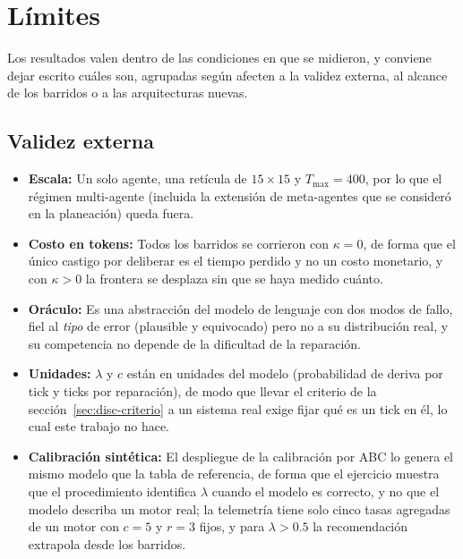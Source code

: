 \section{Límites}\label{sec:limites}

Los resultados valen dentro de las condiciones en que se midieron, y conviene dejar escrito cuáles son, agrupadas según afecten a la validez externa, al alcance de los barridos o a las arquitecturas nuevas.

\subsection*{Validez externa}

\begin{itemize}[leftmargin=1.4em, itemsep=0.3em]
  \item \textbf{Escala:} Un solo agente, una retícula de $15\times15$ y $T_{\mathrm{max}}=400$, por lo que el régimen multi-agente (incluida la extensión de meta-agentes que se consideró en la planeación) queda fuera.
  \item \textbf{Costo en tokens:} Todos los barridos se corrieron con $\kappa=0$, de forma que el único castigo por deliberar es el tiempo perdido y no un costo monetario, y con $\kappa>0$ la frontera se desplaza sin que se haya medido cuánto.
  \item \textbf{Oráculo:} Es una abstracción del modelo de lenguaje con dos modos de fallo, fiel al \emph{tipo} de error (plausible y equivocado) pero no a su distribución real, y su competencia no depende de la dificultad de la reparación.
  \item \textbf{Unidades:} $\lambda$ y $c$ están en unidades del modelo (probabilidad de deriva por tick y ticks por reparación), de modo que llevar el criterio de la sección~\ref{sec:disc-criterio} a un sistema real exige fijar qué es un tick en él, lo cual este trabajo no hace.
  \item \textbf{Calibración sintética:} El despliegue de la calibración por ABC lo genera el mismo modelo que la tabla de referencia, de forma que el ejercicio muestra que el procedimiento identifica $\lambda$ cuando el modelo es correcto, y no que el modelo describa un motor real; la telemetría tiene solo cinco tasas agregadas de un motor \OL{} con $c=5$ y $r=3$ fijos, y para $\lambda>0.5$ la recomendación extrapola desde los barridos.
\end{itemize}

